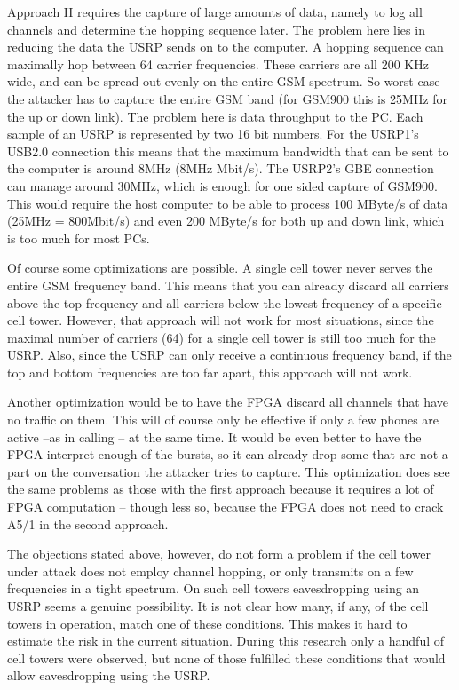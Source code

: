 \documentclass[a4paper,11pt]{llncs}
\begin{document}
Approach II requires the capture of large amounts of data, namely to log all channels and determine the hopping sequence later. The problem here lies in reducing the data the USRP sends on to the computer. A hopping sequence can maximally hop between 64 carrier frequencies. These carriers are all 200 KHz wide, and can be spread out evenly on the entire GSM spectrum. So worst case the attacker has to capture the entire GSM band (for GSM900 this is 25MHz for the up or down link). The problem here is data throughput to the PC. Each sample of an USRP is represented by two 16 bit numbers. For the USRP1's USB2.0 connection this means that the maximum bandwidth that can be sent to the computer is around 8MHz (8MHz Mbit/s). The USRP2's GBE connection can manage around 30MHz, which is enough for one sided capture of GSM900. This would require the host computer to be able to process 100 MByte/s of data (25MHz  = 800Mbit/s) and even 200 MByte/s for both up and down link, which is too much for most PCs.
 
Of course some optimizations are possible. A single cell tower never serves the entire GSM frequency band. This means that you can already discard all carriers above the top frequency and all carriers below the lowest frequency of a specific cell tower. However, that approach will not work for most situations, since the maximal number of carriers (64) for a single cell tower is still too much for the USRP. Also, since the USRP can only receive a continuous frequency band, if the top and bottom frequencies are too far apart, this approach will not work.

Another optimization would be to have the FPGA discard all channels that have no traffic on them. This will of course only be effective if only a few phones are active --as in calling -- at the same time. It would be even better to have the FPGA interpret enough of the bursts, so it can already drop some that are not a part on the conversation the attacker tries to capture. This optimization does see the same problems as those with the first approach because it requires a lot of FPGA computation -- though less so, because the FPGA does not need to crack A5/1 in the second approach.

The objections stated above, however, do not form a problem if the cell tower under attack does not employ channel hopping, or only transmits on a few frequencies in a tight spectrum. On such cell towers eavesdropping using an USRP seems a genuine possibility. It is not clear how many, if any, of the cell towers in operation, match one of these conditions. This makes it hard to estimate the risk in the current situation. During this research only a handful of cell towers were observed, but none of those fulfilled these conditions that would allow eavesdropping using the USRP.\\
\end{document}

